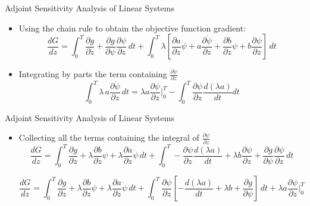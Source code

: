 \documentclass[10pt]{beamer}
\begin{document}
\begin{frame}{Adjoint Sensitivity Analysis of Linear Systems}
	\begin{itemize}
		\item Using the chain rule to obtain the objective function gradient:
		\begin{dmath}
\frac{dG}{dz} = \int^T_0 \frac{\partial g}{\partial z}
+ \frac{\partial g}{\partial \psi} \frac{\partial \psi}{\partial z} \, dt + \int^T_0  \lambda \left[   \frac{\partial a}{\partial z} \dot{\psi} + a \frac{\partial \dot{\psi}}{\partial z} + \frac{\partial b}{\partial z} \psi + b \frac{\partial \psi}{\partial z}\right] \, dt
		\end{dmath} 
\item Integrating by parts the term containing $\frac{\partial \dot{\psi}}{\partial z} $
\begin{equation}
 \int^T_0 \lambda \, a  \frac{\partial \dot{\psi}}{\partial z} \, dt  = \lambda a \frac{\partial \psi}{\partial z} |^T_0 -  \int^T_0  \frac{\partial \psi}{\partial z} \frac{d(\lambda a)}{dt} dt    
\end{equation}
	\end{itemize}
\end{frame}
\begin{frame}{Adjoint Sensitivity Analysis of Linear Systems}
	\begin{itemize}
	\item Collecting all the terms containing the integral of  $\frac{\partial \psi}{\partial z} $
		\begin{dmath}
		\frac{dG}{dz} = \int^T_0 \frac{\partial g}{\partial z}
		+ \lambda \frac{\partial b}{\partial z} \psi + \lambda \frac{\partial a}{\partial z} \dot{\psi}  \, dt + \int^T_0  -\frac{\partial \psi}{\partial z}  \frac{d(\lambda a)}{dt} +  \lambda b \frac{\partial \psi}{\partial z} +  \frac{\partial g}{\partial \psi} \frac{\partial \psi}{\partial z} \, dt
		\end{dmath}
		
		\begin{dmath}
			\frac{dG}{dz} = \int^T_0 \frac{\partial g}{\partial z}
			+ \lambda \frac{\partial b}{\partial z} \psi + \lambda \frac{\partial a}{\partial z} \dot{\psi}  \, dt + \int^T_0  \frac{\partial \psi}{\partial z} \left[-   \frac{d(\lambda a)}{dt} +  \lambda b +  \frac{\partial g}{\partial \psi} \right]  \, dt + \lambda a \frac{\partial \psi}{\partial z} |^T_0 
		\end{dmath} 		 
	\end{itemize}
\end{frame}
\end{document}
